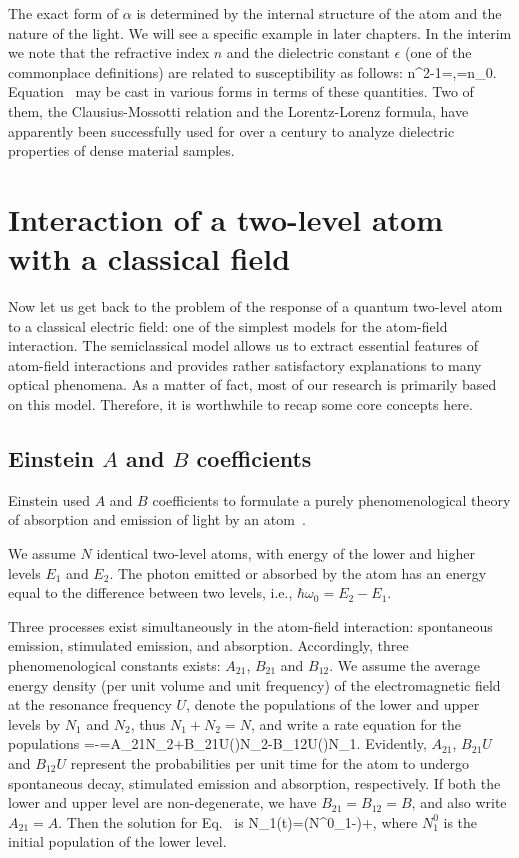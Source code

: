 The exact form of $\alpha$ is determined by the internal structure of the atom and the nature of the light. We will see a specific example in later chapters. In the interim we note that the refractive index $n$ and the dielectric constant $\epsilon$ (one of the commonplace definitions) are related to susceptibility as follows:
\beq
n^2-1=\chi,\quad \epsilon=n\epsilon_0.
\eeq
Equation~ may be cast in various forms in terms of these quantities. Two of them, the Clausius-Mossotti relation and the Lorentz-Lorenz formula, have apparently been successfully used for over a century to analyze dielectric properties of dense material samples.

\section{Interaction of a two-level atom with a classical field}

Now let us get back to the problem of the response of a quantum two-level atom to a classical electric field: one of the simplest models for the atom-field interaction\cite{quantum_optics}. The semiclassical model allows us to extract essential features of atom-field interactions and provides rather satisfactory explanations to many optical phenomena. As a matter of fact, most of our research is primarily based on this model. Therefore, it is worthwhile to recap some core concepts here.

\subsection{Einstein $A$ and $B$ coefficients}
Einstein used $A$ and $B$ coefficients to formulate a purely phenomenological theory of  absorption and emission of light by an atom~\cite{quantum_optics,1982AmJPh..50..982H}.

We assume $N$ identical two-level atoms, with energy of the lower and higher levels  $E_1$ and $E_2$. The photon emitted or absorbed by the atom has an energy equal to the difference between two levels, i.e., $\hbar\omega_0=E_2-E_1$.

Three processes exist simultaneously in the atom-field interaction: spontaneous emission, stimulated emission, and absorption. Accordingly, three phenomenological constants exists: $A_{21}$, $B_{21}$ and $B_{12}$. We assume the average energy density (per unit volume and unit frequency) of the electromagnetic field at the resonance frequency $U$, denote the populations of the lower and upper levels by $N_1$ and $N_2$, thus $N_1+N_2=N$, and write a rate equation for the populations
\bea
{}=-=A_{21}N_2+B_{21}U(\omega)N_2-B_{12}U(\omega)N_1.
\label{AB_RATE}
\eea
Evidently, $A_{21}$, $B_{21}U$ and $B_{12}U$ represent the probabilities per unit time for the atom to undergo spontaneous decay, stimulated emission and absorption, respectively. 
If  both the lower and upper level are non-degenerate, we  have $B_{21}=B_{12}=B$, and also write $A_{21}=A$. Then the solution for Eq.~ is
\bea
N_1(t)=\left(N^0_1-\right)\exp{}+,
\eea
where $N^0_1$ is the initial population of the lower level.

